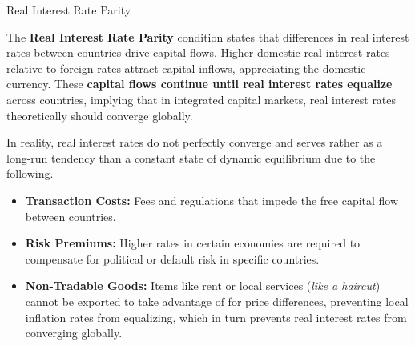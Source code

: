\documentclass[10pt]{article}
\begin{document}
    \begin{core}[label=core:rirp]{Real Interest Rate Parity}

      The \textbf{Real Interest Rate Parity} condition states that differences in real interest rates between countries drive capital flows. Higher domestic real interest rates relative to foreign rates attract capital inflows, appreciating the domestic currency. These \textbf{capital flows continue until real interest rates equalize} across countries, implying that in integrated capital markets, real interest rates theoretically should converge globally.

      In reality, real interest rates do not perfectly converge and serves rather as a long-run tendency than a constant state of dynamic equilibrium due to the following.

      \begin{itemize}

          \item \textbf{Transaction Costs:} Fees and regulations that impede the free capital flow between countries.

          \item \textbf{Risk Premiums:} Higher rates in certain economies are required to compensate for political or default risk in specific countries.

          \item \textbf{Non-Tradable Goods:} Items like rent or local services (\textit{like a haircut}) cannot be exported to take advantage of for price differences, preventing local inflation rates from equalizing, which in turn prevents real interest rates from converging globally.

      \end{itemize}

    \end{core}
\end{document}
